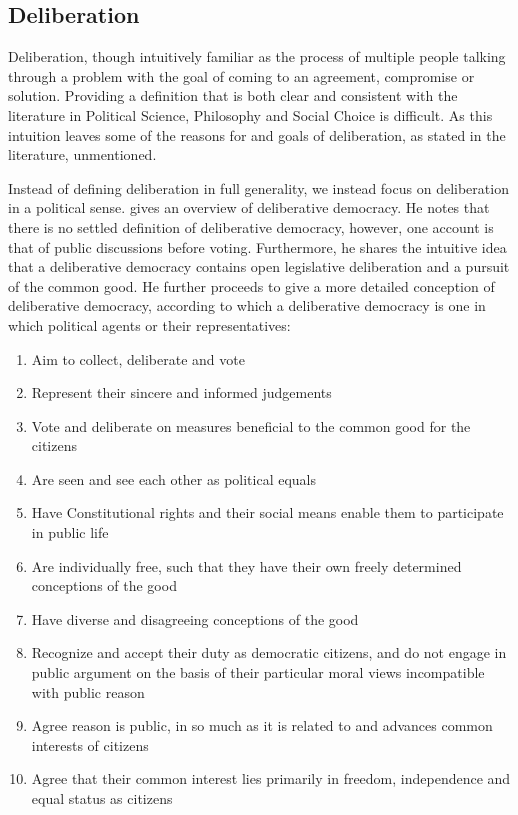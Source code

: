 \subsection{Deliberation}

Deliberation, though intuitively familiar as
the process of multiple people talking through a problem with the goal of
coming to an agreement, compromise or solution. Providing a definition that is
both clear and consistent with the literature in Political Science, Philosophy
and Social Choice is difficult.  As this intuition leaves some of the reasons for
and goals of deliberation, as stated in the literature, unmentioned.

Instead of defining deliberation in full generality, we instead focus on
deliberation in a political
sense. \citet{freemanDeliberativeDemocracySympathetic2000} gives an overview of
deliberative democracy. He notes that there is no settled definition of
deliberative democracy, however, one account is that of public discussions
before voting. Furthermore, he shares the intuitive idea that a deliberative
democracy contains open legislative deliberation and a pursuit of the common
good. He further proceeds to give a more detailed conception of deliberative
democracy, according to which a deliberative democracy is one in which
political agents or their representatives:

\begin{enumerate}
	\label{list:deliberative-democracy}
	\setlength\itemsep{1px}
	\item  Aim to collect, deliberate and vote
	\item  Represent their sincere and informed judgements
	\item  Vote and deliberate on measures beneficial to the common good for the citizens
	\item  Are seen and see each other as political equals
	\item  Have Constitutional rights and their social means enable them to participate in public life
	\item  Are individually free, such that they have their own freely determined conceptions of the good
	\item  Have diverse and disagreeing conceptions of the good
	\item  Recognize and accept their duty as democratic citizens, and do not engage in public argument on the basis of their particular moral views incompatible with public reason
	\item  Agree reason is public, in so much as it is related to and advances common interests of citizens
	\item  Agree that their common interest lies primarily in freedom, independence and equal status as citizens
\end{enumerate}

